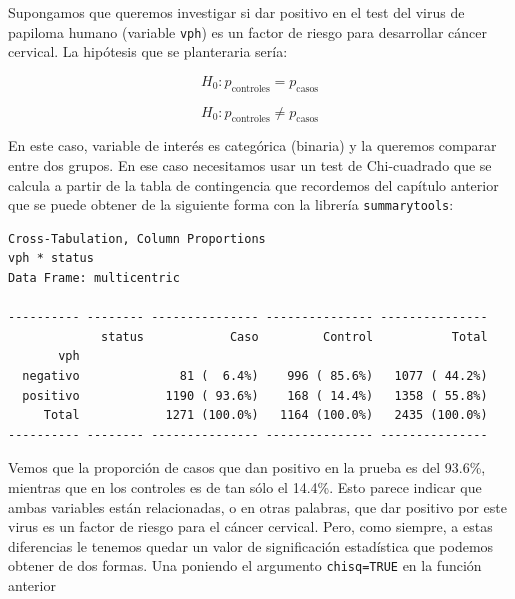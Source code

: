 \documentclass[
]{book}
\newenvironment{Shaded}{\begin{snugshade}}{\end{snugshade}}
\newcommand{\AttributeTok}[1]{\textcolor[rgb]{0.77,0.63,0.00}{#1}}
\newcommand{\FunctionTok}[1]{\textcolor[rgb]{0.00,0.00,0.00}{#1}}
\newcommand{\NormalTok}[1]{#1}
\newcommand{\SpecialCharTok}[1]{\textcolor[rgb]{0.00,0.00,0.00}{#1}}
\newcommand{\StringTok}[1]{\textcolor[rgb]{0.31,0.60,0.02}{#1}}
\begin{document}
Supongamos que queremos investigar si dar positivo en el test del virus de papiloma humano (variable \texttt{vph}) es un factor de riesgo para desarrollar cáncer cervical. La hipótesis que se planteraria sería:

\[H_0: p_{\text{controles}}  = p_{\text{casos}}\]

\[H_0: p_{\text{controles}}  \neq p_{\text{casos}}\]

En este caso, variable de interés es categórica (binaria) y la queremos comparar entre dos grupos. En ese caso necesitamos usar un test de Chi-cuadrado que se calcula a partir de la tabla de contingencia que recordemos del capítulo anterior que se puede obtener de la siguiente forma con la librería \texttt{summarytools}:

\begin{Shaded}
\end{Shaded}

\begin{verbatim}
Cross-Tabulation, Column Proportions  
vph * status  
Data Frame: multicentric  

---------- -------- --------------- --------------- ---------------
             status            Caso         Control           Total
       vph                                                         
  negativo              81 (  6.4%)    996 ( 85.6%)   1077 ( 44.2%)
  positivo            1190 ( 93.6%)    168 ( 14.4%)   1358 ( 55.8%)
     Total            1271 (100.0%)   1164 (100.0%)   2435 (100.0%)
---------- -------- --------------- --------------- ---------------
\end{verbatim}

Vemos que la proporción de casos que dan positivo en la prueba es del 93.6\%, mientras que en los controles es de tan sólo el 14.4\%. Esto parece indicar que ambas variables están relacionadas, o en otras palabras, que dar positivo por este virus es un factor de riesgo para el cáncer cervical. Pero, como siempre, a estas diferencias le tenemos quedar un valor de significación estadística que podemos obtener de dos formas. Una poniendo el argumento \texttt{chisq=TRUE} en la función anterior
\end{document}
